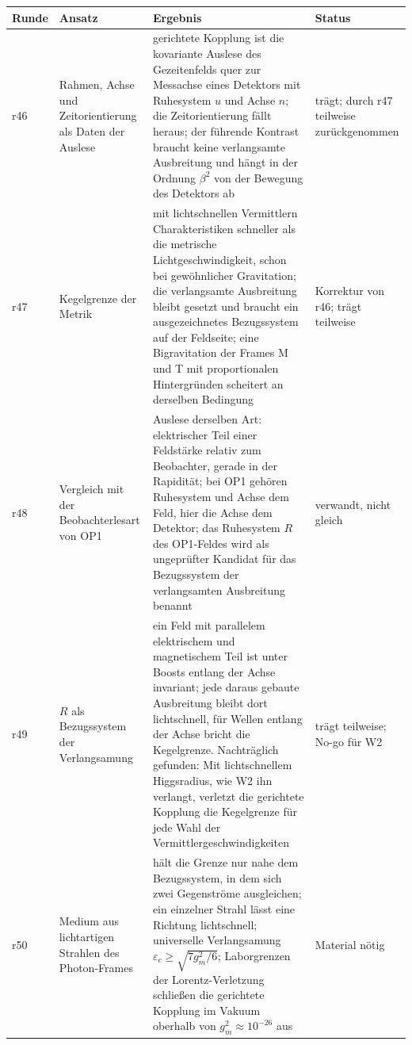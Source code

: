\begin{center}
\small
\begin{tabular}{@{}p{.07\linewidth}p{.25\linewidth}p{.43\linewidth}p{.15\linewidth}@{}}
\hline
\textbf{Runde} & \textbf{Ansatz} & \textbf{Ergebnis} & \textbf{Status} \\
\hline
r46 & Rahmen, Achse und Zeitorientierung als Daten der Auslese & gerichtete Kopplung ist die kovariante Auslese des Gezeitenfelds quer zur Messachse eines Detektors mit Ruhesystem \(u\) und Achse \(n\); die Zeitorientierung fällt heraus; der führende Kontrast braucht keine verlangsamte Ausbreitung und hängt in der Ordnung \(\beta^2\) von der Bewegung des Detektors ab & trägt; durch r47 teilweise zurückgenommen \\
r47 & Kegelgrenze der Metrik & mit lichtschnellen Vermittlern Charakteristiken schneller als die metrische Lichtgeschwindigkeit, schon bei gewöhnlicher Gravitation; die verlangsamte Ausbreitung bleibt gesetzt und braucht ein ausgezeichnetes Bezugssystem auf der Feldseite; eine Bigravitation der Frames M und T mit proportionalen Hintergründen scheitert an derselben Bedingung & Korrektur von r46; trägt teilweise \\
r48 & Vergleich mit der Beobachterlesart von OP1 & Auslese derselben Art: elektrischer Teil einer Feldstärke relativ zum Beobachter, gerade in der Rapidität; bei OP1 gehören Ruhesystem und Achse dem Feld, hier die Achse dem Detektor; das Ruhesystem \(R\) des OP1-Feldes wird als ungeprüfter Kandidat für das Bezugssystem der verlangsamten Ausbreitung benannt & verwandt, nicht gleich \\
r49 & \(R\) als Bezugssystem der Verlangsamung & ein Feld mit parallelem elektrischem und magnetischem Teil ist unter Boosts entlang der Achse invariant; jede daraus gebaute Ausbreitung bleibt dort lichtschnell, für Wellen entlang der Achse bricht die Kegelgrenze. Nachträglich gefunden: Mit lichtschnellem Higgsradius, wie W2 ihn verlangt, verletzt die gerichtete Kopplung die Kegelgrenze für jede Wahl der Vermittlergeschwindigkeiten & trägt teilweise; No-go für W2 \\
r50 & Medium aus lichtartigen Strahlen des Photon-Frames & hält die Grenze nur nahe dem Bezugssystem, in dem sich zwei Gegenströme ausgleichen; ein einzelner Strahl lässt eine Richtung lichtschnell; universelle Verlangsamung \(\varepsilon_c\ge\sqrt{7g_m^2/6}\); Laborgrenzen der Lorentz-Verletzung schließen die gerichtete Kopplung im Vakuum oberhalb von \(g_m^2\approx10^{-26}\) aus & Material nötig \\

\end{tabular}
\end{center}
